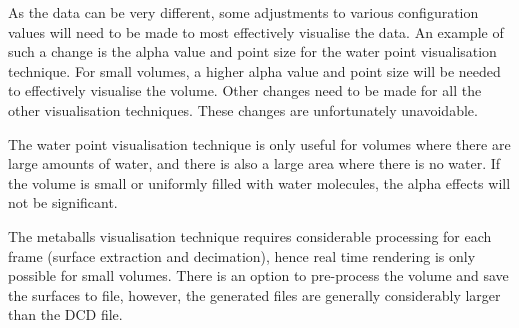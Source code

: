 As the data can be very different, some adjustments to various configuration
values will need to be made to most effectively visualise the data. An example
of such a change is the alpha value and point size for the water point
visualisation technique. For small volumes, a higher alpha value and point size
will be needed to effectively visualise the volume. Other changes need to be
made for all the other visualisation techniques. These changes are
unfortunately unavoidable.

The water point visualisation technique is only useful for volumes where there
are large amounts of water, and there is also a large area where there is no
water. If the volume is small or uniformly filled with water molecules, the
alpha effects will not be significant.

The metaballs visualisation technique requires considerable processing for each
frame (surface extraction and decimation), hence real time rendering is only
possible for small volumes. There is an option to pre-process the volume and
save the surfaces to file, however, the generated files are generally
considerably larger than the DCD file.



